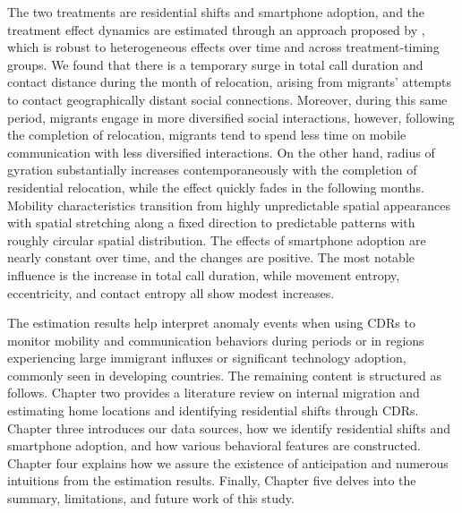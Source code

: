 The two treatments are residential shifts and smartphone adoption, and the treatment effect dynamics are estimated through an approach proposed by \cite{callaway2021difference}, which is robust to heterogeneous effects over time and across treatment-timing groups.
We found that there is a temporary surge in total call duration and contact distance during the month of relocation, arising from migrants' attempts to contact geographically distant social connections.
Moreover, during this same period, migrants engage in more diversified social interactions, however, following the completion of relocation, migrants tend to spend less time on mobile communication with less diversified interactions. On the other hand, radius of gyration substantially increases contemporaneously with the completion of residential relocation, while the effect quickly fades in the following months. Mobility characteristics transition from highly unpredictable spatial appearances with spatial stretching along a fixed direction to predictable patterns with roughly circular spatial distribution. The effects of smartphone adoption are nearly constant over time, and the changes are positive.
The most notable influence is the increase in total call duration, while movement entropy, eccentricity, and contact entropy all show modest increases.

The estimation results help interpret anomaly events when using CDRs to monitor mobility and communication behaviors during periods or in regions experiencing large immigrant influxes or significant technology adoption, commonly seen in developing countries. The remaining content is structured as follows. Chapter two provides a literature review on internal migration and estimating home locations and identifying residential shifts through CDRs. Chapter three introduces our data sources, how we identify residential shifts and smartphone adoption, and how various behavioral features are constructed. Chapter four explains how we assure the existence of anticipation and numerous intuitions from the estimation results. Finally, Chapter five delves into the summary, limitations, and future work of this study.
